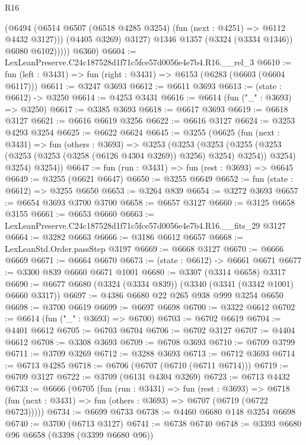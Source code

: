 \begin{lexlean}{R16}
\begin{coremodule}
                  (@6494
                    (@6514 @6507 (@6518 @4285 @3254) (fun (next : @4251) => @6112 @4432 @3127)))
                  (@4405 @3269)
                  @3127)
                @1346
                @1357
                (@3324 (@3334 @1346))
                @6080
                @6102)))))
      @6360)
@6604 := LexLeanPreserve.C24c187528d1f71c5fce57d0056e4e7b4.R16.__rel_3
@6610 := fun (left : @3431) => fun (right : @3431) => @6153 (@6283 (@6603 (@6604 @6117)))
@6611 := @3247 @3693
@6612 := @6611 @3693
@6613 := (state : @6612) -> @3250
@6614 := @4253 @3431
@6616 := @6614 (fun ("_" : @3693) => @3250)
@6617 := @3385 @3693
@6618 := @6617 @3693
@6619 := @6618 @3127
@6621 := @6616 @6619 @3256
@6622 := @6616 @3127
@6624 := @3253 @4293 @3254
@6625 := @6622 @6624
@6645 := @3255
    (@6625
      (fun (next : @3431) =>
      fun (others : @3693) =>
      @3253
        (@3253
          (@3253
            (@3255 (@3253 (@3253 (@3253 (@3258 (@6126 @4304 @3269)) @3256) @3254) @3254))
            @3254)
          @3254)
        @3254))
@6647 := fun (run : @3431) => fun (rest : @3693) => @6645
@6649 := @3255 (@6621 @6647)
@6650 := @3255 @6649
@6652 := fun (state : @6612) => @3255 @6650
@6653 := @3264 @839
@6654 := @3272 @3693
@6657 := @6654 @3693 @3700 @3700
@6658 := @6657 @3127
@6660 := @3125 @6658 @3155
@6661 := @6653 @6660
@6663 := LexLeanPreserve.C24c187528d1f71c5fce57d0056e4e7b4.R16.__fits_29 @3127
@6664 := @3282 @6663
@6666 := @3186 @6612 @6657
@6668 := LexLeanStd.Order.passStep @3197
@6669 := @6668 @3127
@6670 := @6666 @6669
@6671 := @6664 @6670
@6673 := (state : @6612) -> @6661 @6671
@6677 := @3300 @839 @6660 @6671 @1001
@6680 := @3307 (@3314 @6658) @3317
@6690 := @6677 @6680 (@3324 (@3334 @839)) (@3340 (@3341 (@3342 @1001) @6660 @3317))
@6697 := @4386 @6680 @22 @265 @938 @999 @3254 @6650
@6698 := @3700 @6619
@6699 := @6697 @6698
@6700 := @3322 @6612
@6702 := @6614 (fun ("_" : @3693) => @6700)
@6703 := @6702 @6619
@6704 := @4401 @6612
@6705 := @6703 @6704
@6706 := @6702 @3127
@6707 := @4404 @6612
@6708 := @3308 @3693
@6709 := @6708 @3693
@6710 := @6709 @3799
@6711 := @3709 @3269
@6712 := @3288 @3693
@6713 := @6712 @3693
@6714 := @6713 @4285
@6718 := @6706 (@6707 (@6710 (@6711 @6714)))
@6719 := @6709 @3127
@6722 := @3709 (@6131 @4304 @3269)
@6723 := @6713 @4432
@6733 := @6666
    (@6705
      (fun (run : @3431) =>
      fun (rest : @3693) =>
      @6718 (fun (next : @3431) => fun (others : @3693) => @6707 (@6719 (@6722 @6723)))))
@6734 := @6699 @6733
@6738 := @4460 @6680 @148 @3254 @6698
@6740 := @3700 (@6713 @3127)
@6741 := @6738 @6740
@6748 := @3393 @6680 @96 @6658 (@3398 (@3399 @6680 @96))

\end{coremodule}
\end{lexlean}
